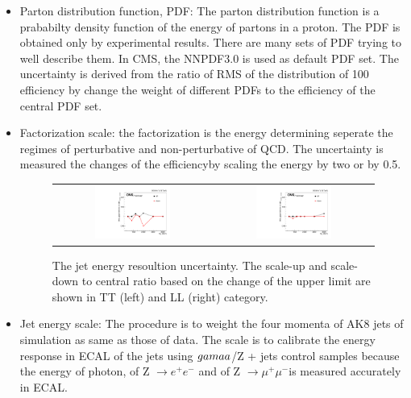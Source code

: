 \begin{itemize}
  \item Parton distribution function, PDF: The parton distribution function is a prababilty density function of the energy of partons in a proton. The PDF is obtained only by experimental results. There are many sets of PDF trying to well describe them. In CMS, the NNPDF3.0 is used as default PDF set\citep{Ball:2014uwa}. The uncertainty is derived from the ratio of RMS of the distribution of 100 efficiency by change the weight of different PDFs to the efficiency of the central PDF set. 
	
	\item Factorization scale: the factorization is the energy determining seperate the regimes of perturbative and non-perturbative of QCD. The uncertainty is measured the changes of the efficiencyby scaling the energy by two or by 0.5.
  
  \begin{figure}[t]
  \centering
 \begin{tabular}{cc}
    \includegraphics[width=0.5\textwidth]{Figures/plots_uncert/JER_TT.pdf} &
   \includegraphics[width=0.5\textwidth]{Figures/plots_uncert/JER_LL.pdf} \\
  \end{tabular}
  \caption{The jet energy resoultion uncertainty. The scale-up and scale-down to central ratio based on the change of the upper limit are shown in TT (left) and LL (right) category.}
  \label{fig:hvt_brs}
\end{figure}  
  \item Jet energy scale: The procedure is to weight the four momenta of AK8 jets of simulation as same as those of data\citep{Chatrchyan:2011ds}. The scale is to calibrate the energy response in ECAL of the jets using $\\gamaa$/Z + jets control samples because the energy of photon, of Z $\rightarrow e^+e^-$ and of Z $\rightarrow \mu^+\mu^-$is measured accurately in ECAL.
  

\end{itemize}
